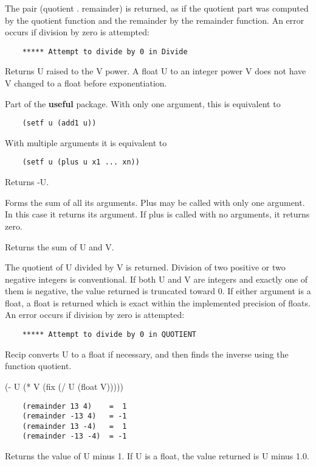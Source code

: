 {    The  pair  (quotient  .  remainder)  is  returned, as if the
    quotient part was computed by the quotient function and  the
    remainder  by  the  remainder  function.  An error occurs if
    division by zero is attempted:
}
\begin{verbatim}
    ***** Attempt to divide by 0 in Divide
\end{verbatim}

{    Returns U raised to the V power.  A float U  to  an  integer
    power   V  does  not  have  V  changed  to  a  float  before
    exponentiation.
}

{    Part of the {\bf useful} package. With only one argument,
	this is equivalent to
}
\begin{verbatim}
    (setf u (add1 u))
\end{verbatim}
    With multiple arguments it is equivalent to
\begin{verbatim}
    (setf u (plus u x1 ... xn))
\end{verbatim}
{    Returns -U.
}

{    Forms the sum of all its arguments.  Plus may be called with
    only  one  argument.   In this case it returns its argument.
    If plus is called with no arguments, it returns zero.
}

{    Returns the sum of U and V.  }

{    The quotient of U divided by V is returned.  Division of two
    positive or two negative integers is conventional.  If  both
    U  and  V  are integers and exactly one of them is negative,
    the value  returned  is  truncated  toward  0.    If  either
    argument  is  a  float,  a  float is returned which is exact
    within the implemented precision of floats.  An error occurs
    if division by zero is attempted:
}
\begin{verbatim}
    ***** Attempt to divide by 0 in QUOTIENT
\end{verbatim}
{    Recip converts U to a float if necessary, and then finds the
    inverse using the function quotient.  }

{    (- U (* V (fix (/ U (float V))))) }
\begin{verbatim}
    (remainder 13 4)    =  1
    (remainder -13 4)   = -1
    (remainder 13 -4)   =  1
    (remainder -13 -4)  = -1
\end{verbatim}
{    Returns the value of U minus 1.  If U is a float, the  value
    returned is U minus 1.0.  }


